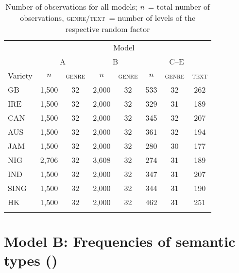 \begin{table}
\caption{Number of observations for all models; \textit{n}~= total number of observations, \textsc{genre}/\textsc{text}~= number of levels of the respective random factor\label{tab:B.1}}
\begin{tabular}{l *7{c}}
\lsptoprule
        & \multicolumn{7}{c}{Model} \\\cmidrule(lr){2-8}
        & \multicolumn{2}{c}{A}& \multicolumn{2}{c}{B} & \multicolumn{3}{c}{C–E}\\\cmidrule(lr){2-3}\cmidrule(lr){4-5}\cmidrule(lr){6-8}
Variety & $n$ & \textsc{genre} & $n$ & \textsc{genre}  & $n$ & \textsc{genre} & \textsc{text}\\\midrule
GB  	& 1,500	& 32  & 2,000  & 32 & 533  & 32 & 262\\
IRE 	& 1,500 & 32  & 2,000  & 32 & 329  & 31 & 189\\ 
CAN 	& 1,500 & 32  & 2,000  & 32 & 345  & 32 & 207\\
AUS 	& 1,500	& 32  & 2,000  & 32 & 361  & 32 & 194\\
JAM 	& 1,500 & 32  & 2,000  & 32 & 280  & 30 & 177\\ 
NIG 	& 2,706 & 32  & 3,608  & 32 & 274  & 31 & 189\\ 
IND     & 1,500 & 32  & 2,000  & 32 & 347  & 31 & 207\\
SING    & 1,500 & 32  & 2,000  & 32 & 344  & 31 & 190\\
HK      & 1,500 & 32  & 2,000  & 32 & 462  & 31 & 251\\
\lspbottomrule
\end{tabular}
\end{table}

\section{\label{bkm:Ref41307102}Model B: Frequencies of semantic types ()}\label{appendix:B.2}

